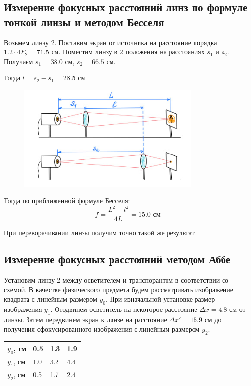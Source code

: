 \documentclass[a4paper,12pt]{article}
\theoremstyle{definition}
\begin{document}
\subsection{Измерение фокусных расстояний линз по формуле тонкой линзы и
методом Бесселя}

Возьмем линзу 2. Поставим экран от источника на расстояние  порядка $1.2 \cdot 4 F_2 = 71.5$ см.
Поместим линзу в 2 положения на расстояниях $s_1$ и $s_2$. Получаем $s_1 = 38.0$ см, $s_2 = 66.5$ см. 
\par Тогда $l = s_2 - s_1 = 28.5$ см

\begin{figure}[h!]
    \centering
    \includegraphics[width=9cm]{r.jpg}
    \label{fig:vac}
\end{figure}

Тогда по приближенной формуле Бесселя:
\begin{equation*}
    f = \frac{L^2-l^2}{4L} = 15.0 \text{ см}
\end{equation*}

При переворачивании линзы получим точно такой же результат.



\subsection{Измерение фокусных расстояний методом Аббе}

Установим линзу 2 между осветителем и транспорантом в соответствии со схемой. В качестве физического предмета будем рассматривать изображение квадрата с линейным размером $y_0$. 
При изначальной установке размер изображения $y_1$. Отодвинем осветитель на некоторое расстояние $\Delta x = 4.8$ см от линзы. Затем передвинем экран к линзе на расстояние $\Delta x' = 15.9$ см до 
получения сфокусированного изображения с линейным размером $y_2$.

\begin{table}[h!]
    \centering
    \begin{tabular}{|l|l|l|l|} \hline
    $y_0$, см  & 0.5 & 1.3 & 1.9  \\ \hline
    $y_1$, см  & 1.0 & 3.2 & 4.4  \\ \hline
    $y_2$, см  & 0.5 & 1.7 & 2.4  \\ \hline
    \end{tabular}
\end{table}
\end{document}
